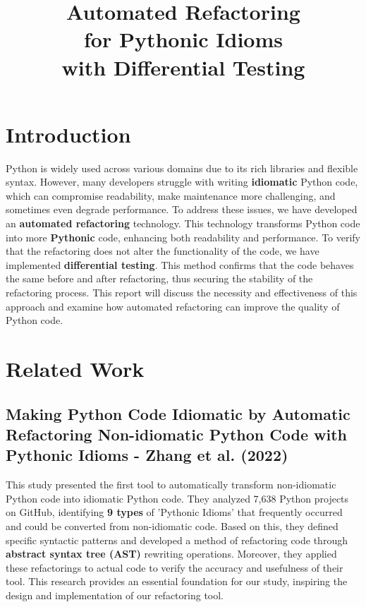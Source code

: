 \documentclass[11pt]{article}
\date{}
\title{Automated Refactoring\\for Pythonic Idioms\\with Differential Testing}
\begin{document}
\maketitle
\vspace{-2cm}
\thispagestyle{fancy}

\section{Introduction}
Python is widely used across various domains due to its rich libraries and flexible syntax. However, many developers struggle with writing \textbf{idiomatic} Python code, which can compromise readability, make maintenance more challenging, and sometimes even degrade performance. To address these issues, we have developed an \textbf{automated refactoring} technology. This technology transforms Python code into more \textbf{Pythonic} code, enhancing both readability and performance. To verify that the refactoring does not alter the functionality of the code, we have implemented \textbf{differential testing}. This method confirms that the code behaves the same before and after refactoring, thus securing the stability of the refactoring process. This report will discuss the necessity and effectiveness of this approach and examine how automated refactoring can improve the quality of Python code.\\

\section{Related Work}
\subsection{Making Python Code Idiomatic by Automatic Refactoring Non-idiomatic Python Code with Pythonic Idioms - Zhang et al. (2022)}
This study presented the first tool to automatically transform non-idiomatic Python code into idiomatic Python code. They analyzed 7,638 Python projects on GitHub, identifying \textbf{9 types} of 'Pythonic Idioms' that frequently occurred and could be converted from non-idiomatic code. Based on this, they defined specific syntactic patterns and developed a method of refactoring code through \textbf{abstract syntax tree (AST)} rewriting operations. Moreover, they applied these refactorings to actual code to verify the accuracy and usefulness of their tool. This research provides an essential foundation for our study, inspiring the design and implementation of our refactoring tool.\\
\end{document}
